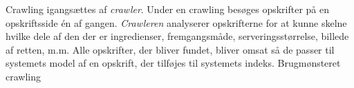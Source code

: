 {Crawling igangsættes af \textit{crawler}. Under en crawling besøges opskrifter på en opskriftsside én af gangen. \textit{Crawleren} analyserer opskrifterne for at kunne skelne hvilke dele af den der er ingredienser, fremgangsmåde, serveringsstørrelse, billede af retten, m.m. Alle opskrifter, der bliver fundet, bliver omsat så de passer til systemets model af en opskrift, der tilføjes til systemets indeks.}
{}
{}
{Brugmønsteret crawling}
